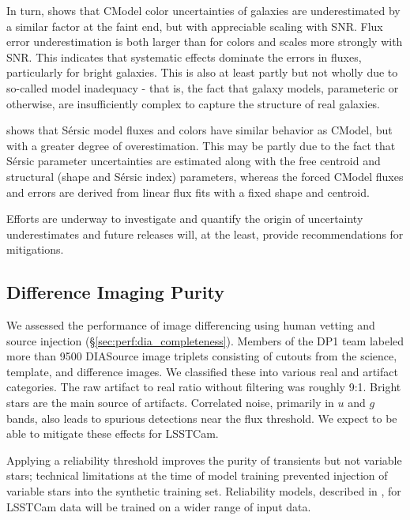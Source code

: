 In turn,  shows that CModel color uncertainties of galaxies are underestimated by a similar factor at the faint end, but with appreciable scaling with \gls{SNR}.
Flux error underestimation is both larger than for colors and scales more strongly with \gls{SNR}.
This indicates that systematic effects dominate the errors in fluxes, particularly for bright galaxies.
This is also at least partly but not wholly due to so-called model inadequacy - that is, the fact that galaxy models, parameteric or otherwise, are insufficiently complex to capture the structure of real galaxies.

 shows that S\'ersic model fluxes and colors have similar behavior as CModel, but with a greater degree of overestimation.
This may be partly due to the fact that S\'ersic parameter uncertainties are estimated along with the free centroid and structural (shape and S\'ersic index) parameters, whereas the forced CModel fluxes and errors are derived from linear flux fits with a fixed shape and centroid.

Efforts are underway to investigate and quantify the origin of uncertainty underestimates and future releases will, at the least, provide recommendations for mitigations.

\subsection{Difference Imaging Purity} 
\label{sec:performance:dia}

We assessed the performance of image differencing using human vetting and source injection (\S \ref{sec:perf:dia_completeness}).
Members of the \gls{DP1} team labeled more than 9500 DIASource image triplets consisting of cutouts from the science, template, and difference images.
We classified these into various real and artifact categories.
The raw artifact to real ratio without filtering was roughly 9:1.
Bright stars are the main source of artifacts.
Correlated noise, primarily in $u$ and $g$ bands, also leads to spurious detections near the flux threshold.
We expect to be able to mitigate these effects for \gls{LSSTCam}.

Applying a reliability threshold improves the purity of transients but not variable stars; technical limitations at the time of model training prevented injection of variable stars into the synthetic training set.
Reliability models, described in ,  for \gls{LSSTCam} data will be trained on a wider range of input data.

